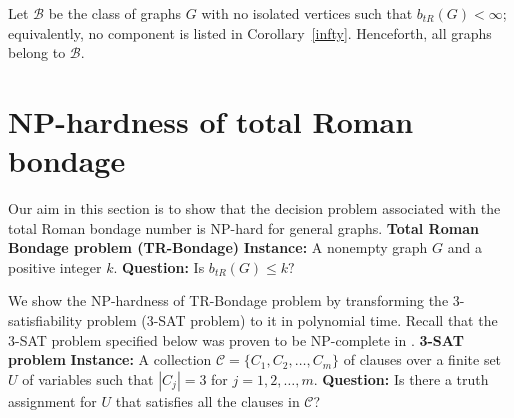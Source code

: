 \documentclass[12pt,reqno]{amsart}
\theoremstyle{plain}
\numberwithin{equation}{section}
\begin{document}
Let $\mathcal{B}$ be the class of graphs $G$ with no isolated vertices such that $b_{tR}(G)<\infty$; equivalently, no component is listed in Corollary~\ref{infty}. Henceforth, all graphs belong to $\mathcal{B}$.

\section{NP-hardness of total Roman bondage}

Our aim in this section is to show that the decision problem associated with
the total Roman bondage number is NP-hard for general graphs. \newline
\newline
\textbf{Total Roman Bondage problem (TR-Bondage)}\newline
\newline
\textbf{Instance: }A nonempty graph $G$ and a positive integer $k$.\newline
\textbf{Question: }Is $b_{tR}(G)\leq k?$

\bigskip

We show the NP-hardness of TR-Bondage problem by transforming the
3-satisfiability problem (3-SAT problem) to it in polynomial time. Recall
that the 3-SAT problem specified below was proven to be NP-complete in \cite%
{GJ}. \newline
\newline
\textbf{3-SAT problem}\newline
\newline
\textbf{Instance:} A collection $\mathcal{C}=\{C_1, C_2, \dots , C_m\}$ of
clauses over a finite set $U$ of variables such that $\left\vert C_j\right\vert =3$ for $j=1,2,\dots ,m.$\newline
\textbf{Question:} Is there a truth assignment for $U$ that satisfies all
the clauses in $\mathcal{C}$?
\end{document}
